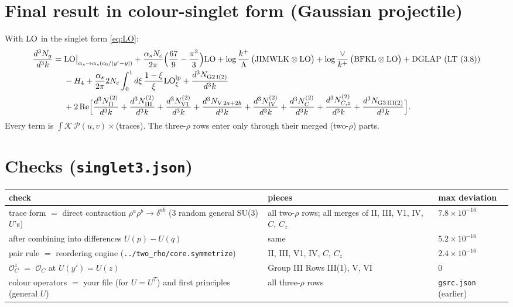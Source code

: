 \documentclass[10pt]{article}
\numberwithin{equation}{section}
\newcommand{\LO}{{\rm LO}}
\newcommand{\PP}{\mathcal P}
\newcommand{\OO}{\mathcal O}
\begin{document}
\section{Final result in colour-singlet form (Gaussian projectile)}
With $\LO$ in the singlet form \eqref{eq:LO}:
\begin{align}
\frac{d^3N_g}{d^3k}={}&\LO\big|_{\alpha_s\to\alpha_s(c_0/|y'-y|)}+\frac{\alpha_sN_c}{2\pi}\Big(\frac{67}{9}-\frac{\pi^2}{3}\Big)\LO+\log\frac{k^+}{\Lambda}\,\big(\text{JIMWLK}\otimes\LO\big)+\log\frac{\vee}{k^+}\,\big(\text{BFKL}\otimes\LO\big)+\text{DGLAP (LT (3.8))}\notag\\
&-H_4+\frac{\alpha_s}{2\pi}2N_c\int_0^1d\xi\,\frac{1-\xi}{\xi}\LO^{\rm lp}_\xi+\frac{d^3N_{\rm G2\,I(2)}}{d^3k}\notag\\
&+2\,{\rm Re}\Big[\frac{d^3N^{(2)}_{\rm II}}{d^3k}+\frac{d^3N^{(2)}_{\rm III}}{d^3k}+\frac{d^3N^{(2)}_{\rm V1}}{d^3k}+\frac{d^3N_{{\rm V}\,2a+2b}}{d^3k}+\frac{d^3N^{(2)}_{\rm IV}}{d^3k}+\frac{d^3N^{(2)}_{C}}{d^3k}+\frac{d^3N^{(2)}_{C,z}}{d^3k}+\frac{d^3N_{\rm G3\,III(2)}}{d^3k}\Big].\label{eq:final}
\end{align}
Every term is $\int\mathcal K\,\PP(u,v)\times$(traces). The three-$\rho$ rows enter only through their merged (two-$\rho$) parts.

\section{Checks (\texttt{singlet3.json})}
\begin{center}\small
\begin{tabular}{@{}p{}p{}p{}@{}}\toprule
check & pieces & max deviation\\\midrule
trace form $=$ direct contraction $\rho^a\rho^b\to\delta^{ab}$ (3 random general SU(3) $U$'s) & all two-$\rho$ rows; all merges of II, III, V1, IV, $C$, $C_z$ & $7.8\times10^{-16}$\\
after combining into differences $U(p)-U(q)$ & same & $5.2\times10^{-16}$\\
pair rule $=$ reordering engine (\texttt{../two\_rho/core.symmetrize}) & II, III, V1, IV, $C$, $C_z$ & $2.4\times10^{-16}$\\
$\OO_C^z$ $=$ $\OO_C$ at $U(y')=U(z)$ & Group III Rows III(1), V, VI & $0$\\
colour operators $=$ your file (for $U=U^T$) and first principles (general $U$) & all three-$\rho$ rows & \texttt{gsrc.json} (earlier)\\\bottomrule
\end{tabular}
\end{center}
\end{document}
